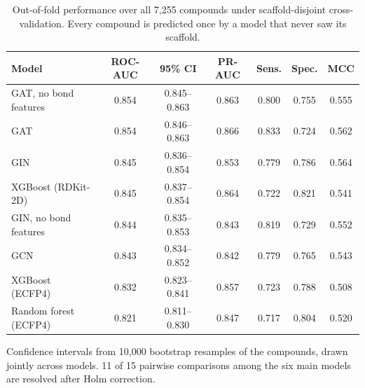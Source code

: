 \begin{table}[htbp]
\centering
\caption{Out-of-fold performance over all 7,255 compounds under scaffold-disjoint cross-validation. Every compound is predicted once by a model that never saw its scaffold.}
\label{tab:accuracy}
\footnotesize
\setlength{\tabcolsep}{4pt}
\begin{tabular}{lcccccc}
\toprule
Model & ROC-AUC & 95\% CI & PR-AUC & Sens. & Spec. & MCC \\
\midrule
GAT, no bond features & 0.854 & 0.845--0.863 & 0.863 & 0.800 & 0.755 & 0.555 \\
GAT & 0.854 & 0.846--0.863 & 0.866 & 0.833 & 0.724 & 0.562 \\
GIN & 0.845 & 0.836--0.854 & 0.853 & 0.779 & 0.786 & 0.564 \\
XGBoost (RDKit-2D) & 0.845 & 0.837--0.854 & 0.864 & 0.722 & 0.821 & 0.541 \\
GIN, no bond features & 0.844 & 0.835--0.853 & 0.843 & 0.819 & 0.729 & 0.552 \\
GCN & 0.843 & 0.834--0.852 & 0.842 & 0.779 & 0.765 & 0.543 \\
XGBoost (ECFP4) & 0.832 & 0.823--0.841 & 0.857 & 0.723 & 0.788 & 0.508 \\
Random forest (ECFP4) & 0.821 & 0.811--0.830 & 0.847 & 0.717 & 0.804 & 0.520 \\
\bottomrule
\end{tabular}
\begin{flushleft}\footnotesize Confidence intervals from 10,000 bootstrap resamples of the compounds, drawn jointly across models. 11 of 15 pairwise comparisons among the six main models are resolved after Holm correction.\end{flushleft}
\end{table}
